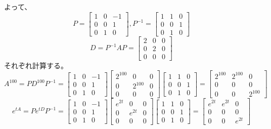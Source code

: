 \documentclass{jsarticle}
\begin{document}
よって、
\begin{equation}
  P = \begin{bmatrix}
    1&0&-1\\
    0&0&1\\
    0&1&0
  \end{bmatrix},
  P^{-1} = \begin{bmatrix}
    1&1&0\\
    0&0&1\\
    0&1&0
  \end{bmatrix}
\end{equation}
\begin{equation}
  D = P^{-1}AP = \begin{bmatrix}
    2&0&0\\
    0&2&0\\
    0&0&0
  \end{bmatrix}
\end{equation}
それぞれ計算する。
\begin{equation}
  A^{100} = PD^{100}P^{-1} = 
  \begin{bmatrix}
    1&0&-1\\
    0&0&1\\
    0&1&0
  \end{bmatrix}
  \begin{bmatrix}
    2^{100}&0&0\\
    0&2^{100}&0\\
    0&0&0
  \end{bmatrix}
  \begin{bmatrix}
    1&1&0\\
    0&0&1\\
    0&1&0
  \end{bmatrix}
  =\begin{bmatrix}
    2^{100}&2^{100}&0\\
    0&0&0\\
    0&0&2^{100}
  \end{bmatrix}
\end{equation}
\begin{equation}
  e^{tA} = Pe^{tD}P^{-1} = 
  \begin{bmatrix}
    1&0&-1\\
    0&0&1\\
    0&1&0
  \end{bmatrix}
  \begin{bmatrix}
    e^{2t}&0&0\\
    0&e^{2t}&0\\
    0&0&0
  \end{bmatrix}
  \begin{bmatrix}
    1&1&0\\
    0&0&1\\
    0&1&0
  \end{bmatrix}
   = \begin{bmatrix}
    e^{2t}&e^{2t}&0\\
    0&0&0\\
    0&0&e^{2t}
  \end{bmatrix}
\end{equation}
\end{document}

